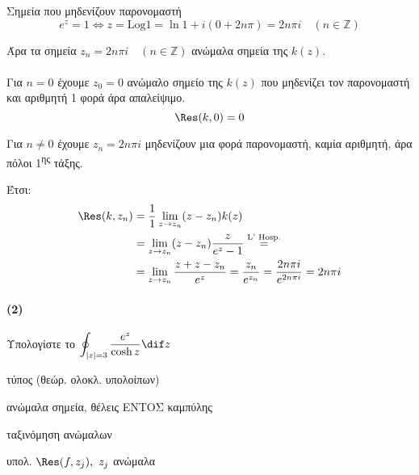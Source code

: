 \documentclass[12pt,a4paper,notitlepage,fleqn]{article}
\begin{document}
\begin{enumlatin}
    	Σημεία που μηδενίζουν παρονομαστή
    	\[
    	e^z = 1 \iff z = \mathrm{Log} 1 = \ln 1 + i(0+2n\pi) = 2n\pi i\quad
    	(n \in \mathbb Z)
    	\]

    	Άρα τα σημεία \( z_n = 2n\pi i \quad (n \in \mathbb Z) \) ανώμαλα σημεία
    	της \( k(z) \).

    	\paragraph{}
    	Για \( n = 0 \) έχουμε \( z_0 = 0 \) ανώμαλο σημείο της \( k(z) \) που
    	μηδενίζει τον παρονομαστή και αριθμητή 1 φορά άρα απαλείψιμο.
    	\[
    	\Res(k,0) = 0
    	\]

    	Για \underline{\( n \neq 0 \)} έχουμε \( z_n = 2n\pi i \) μηδενίζουν μια
    	φορά παρονομαστή, καμία αριθμητή, άρα πόλοι 1\textsuperscript{ης} τάξης.

    	Έτσι:
    	\begin{align*}
    		\Res(k,z_n) &= \frac{1}{1} \lim_{z\to z_n} (z-z_n)k(z)
    		\\ &= \lim_{z\to z_n} (z-z_n)\frac{z}{e^z-1} \overset{\text{L' Hosp.}}{=}
    		\\ &= \lim_{z\to z_n} \frac{z+z-z_n}{e^z} = \frac{z_n}{e^{z_n}}
    		= \frac{2n \pi i}{e^{2n\pi i}} = 2n\pi i
    	\end{align*}
    \end{enumlatin}


    \paragraph{(2)}
    Υπολογίστε το \( \displaystyle \oint_{|z| = 3} \frac{e^z}{\cosh z} \dif z \)

    	\begin{infobox}{}
    		\begin{enumgreekparen}
    			\item τύπος (θεώρ. ολοκλ. υπολοίπων)
    			\item ανώμαλα σημεία, θέλεις ΕΝΤΟΣ καμπύλης
    			\item ταξινόμηση ανώμαλων
    			\item υπολ. \( \Res(f,z_j),\ z_j \) ανώμαλα
    		\end{enumgreekparen}
    	\end{infobox}
\end{document}
